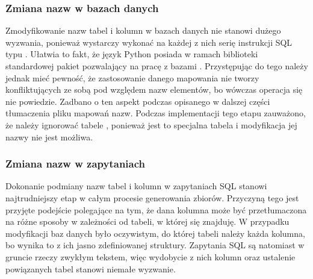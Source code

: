 \subsubsection{Zmiana nazw w bazach danych}
Zmodyfikowanie nazw tabel i kolumn w bazach danych nie stanowi dużego wyzwania, ponieważ wystarczy wykonać na każdej z nich serię instrukcji SQL typu . Ułatwia to fakt, że język Python posiada w ramach biblioteki standardowej pakiet pozwalający na pracę z bazami . Przystępując do tego należy jednak mieć pewność, że zastosowanie danego mapowania nie tworzy konfliktujących ze sobą pod względem nazw elementów, bo wówczas operacja się nie powiedzie. Zadbano o ten aspekt podczas opisanego w dalszej części tłumaczenia pliku mapowań nazw. Podczas implementacji tego etapu zauważono, że należy ignorować tabele , ponieważ jest to specjalna tabela i modyfikacja jej nazwy nie jest możliwa.


\subsubsection{Zmiana nazw w zapytaniach}
Dokonanie podmiany nazw tabel i kolumn w zapytaniach SQL stanowi najtrudniejszy etap w całym procesie generowania zbiorów. Przyczyną tego jest przyjęte podejście polegające na tym, że dana kolumna może być przetłumaczona na różne sposoby w zależności od tabeli, w której się znajduję. W przypadku modyfikacji baz danych było oczywistym, do której tabeli należy każda kolumna, bo wynika to z ich jasno zdefiniowanej struktury. Zapytania SQL są natomiast w gruncie rzeczy zwykłym tekstem, więc wydobycie z nich kolumn oraz ustalenie powiązanych tabel stanowi niemałe wyzwanie.

